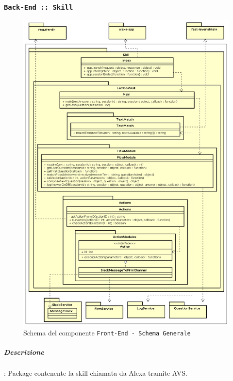 \documentclass[../DefinizioneDiProdotto_v3.0.0.tex]{subfiles}
\begin{document}
\subsubsection{\texttt{Back-End :: Skill}}
\begin{figure}[!h]
	\centering
	\includegraphics[scale=0.45]{Architettura/Back-End/Skill.png}
	\caption{Schema del componente \texttt{Front-End - Schema Generale}}
\end{figure}
\subparagraph{Descrizione}:
Package contenente la skill chiamata da Alexa tramite AVS.
\end{document}
